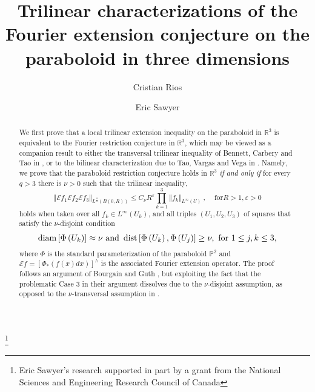 \documentclass{amsart}%
\theoremstyle{plain}
\numberwithin{equation}{section}
\begin{document}
\title[Trilinear characterizations of the Fourier extension conjecture]{Trilinear characterizations of the Fourier extension conjecture on the
paraboloid in three dimensions}
\author{Cristian Rios}
\address{University of Calgary\\
Calgary, Alberta, Canada}
\author{Eric Sawyer}
\address{McMaster University\\
Hamilton, Ontario, Canada}
\thanks{Eric Sawyer's research supported in part by a grant from the National Sciences
and Engineering Research Council of Canada}
\maketitle

\begin{abstract}
We first prove that a local trilinear extension inequality on the paraboloid
in $\mathbb{R}^{3}$ is equivalent to the Fourier restriction conjecture in
$\mathbb{R}^{3}$, which may be viewed as a companion result to either the
transversal trilinear inequality of Bennett, Carbery and Tao in \cite{BeCaTa},
or to the bilinear characterization due to Tao, Vargas and Vega in
\cite{TaVaVe}. Namely, we prove that the paraboloid restriction conjecture
holds in $\mathbb{R}^{3}$ \emph{if and only if} for every $q>3$ there is
$\nu>0$ such that the trilinear inequality,
\[
\left\Vert \mathcal{E}f_{1}\mathcal{E}f_{2}\mathcal{E}f_{3}\right\Vert
_{L^{\frac{q}{3}}\left(  B\left(  0,R\right)  \right)  }\leq C_{\nu
}R^{\varepsilon}\mathop{\displaystyle \prod }\limits_{k=1}^{3}\left\Vert
f_{k}\right\Vert _{L^{\infty}\left(  U\right)  }\ ,\ \ \ \ \ \text{for
}R>1,\varepsilon>0
\]
holds when taken over all $f_{k}\in L^{\infty}\left(  U_{k}\right)  $, and all
triples $\left(  U_{1},U_{2},U_{3}\right)  $ of squares that satisfy the $\nu
$-disjoint condition%
\[
\mathop{\rm diam}\left[  \Phi\left(  U_{k}\right)  \right]  \approx\nu\text{
and }\mathop{\rm dist}\left[  \Phi\left(  U_{k}\right)  ,\Phi\left(
U_{j}\right)  \right]  \geq\nu,\text{ for }1\leq j,k\leq3,
\]
where $\Phi$ is the standard parameterization of the paraboloid $\mathbb{P}%
^{2}$ and $\mathcal{E}f=\left[  \Phi_{\ast}\left(  f\left(  x\right)
dx\right)  \right]  ^{\wedge}$ is the associated Fourier extension operator.
The proof follows an argument of Bourgain and Guth \cite{BoGu}, but exploiting
the fact that the problematic Case 3 in their argument dissolves due to the
$\nu$-disjoint assumption, as opposed to the $\nu$-transversal assumption in
\cite{BeCaTa}.


\end{abstract}
\end{document}
